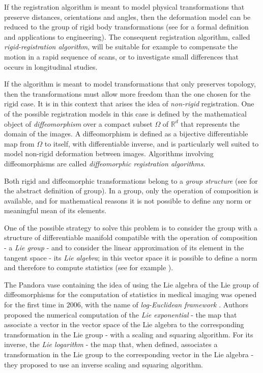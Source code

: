 If the registration algorithm is meant to model physical transformations that preserve distances, orientations and angles, then the deformation model can be reduced to the group of rigid body transformations (see \cite{gallier2011geometric} for a formal definition and applications to engineering). The consequent registration algorithm, called \emph{rigid-registration algorithm}, will be suitable for example to compensate the motion in a rapid sequence of scans, or to investigate small differences that occurs in longitudinal studies.

If the algorithm is meant to model transformations that only preserves topology, then the transformations must allow more freedom than the one chosen for the rigid case. It is in this context that arises the idea of \emph{non-rigid} registration. One of the possible registration models in this case is defined by the mathematical object of \emph{diffeomorphism} over a compact subset $\Omega$ of $\mathbb{R}^{d}$ that represents the domain of the images. A diffeomorphism is defined as a bijective differentiable map from $\Omega$ to itself, with differentiable inverse, and is particularly well suited to model non-rigid deformation between images. Algorithms involving diffeomorphisms are called \emph{diffeomorphic registration algorithms}.

Both rigid and diffeomorphic transformations belong to a \emph{group structure} (see \cite{artin2011algebra} for the abstract definition of group). In a group, only the operation of composition is available, and for mathematical reasons it is not possible to define any norm or meaningful mean of its elements. 

One of the possible strategy to solve this problem is to consider the group with a structure of differentiable manifold compatible with the operation of composition - a \emph{Lie group} - and to consider the linear approximation of its element in the tangent space - its \emph{Lie algebra}; in this vector space it is possible to define a norm and therefore to compute statistics (see for example \cite{lee2012introduction, arnold2006ordinary, warner, do1976differential, misner1973gravitation, holm2009geometric}).

The Pandora vase containing the idea of using the Lie algebra of the Lie group of diffeomorphisms for the computation of statistics in medical imaging was opened for the first time in $2006$, with the name of \emph{log-Euclidean framework} \cite{Arsigny:MRM:06}.
Authors proposed the numerical computation of the \emph{Lie exponential} - the map that associate a vector in the vector space of the Lie algebra to the corresponding transformation in the Lie group - with a scaling and squaring algorithm. For its inverse, the \emph{Lie logarithm} - the map that, when defined, associates a transformation in the Lie group to the corresponding vector in the Lie algebra - they proposed to use an inverse scaling and squaring algorithm.

